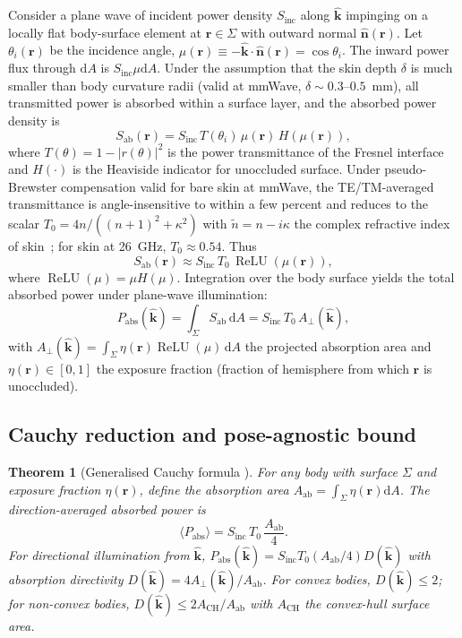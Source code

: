 \documentclass[journal,twocolumn,10pt]{IEEEtran}
\newtheorem{theorem}{Theorem}
\theoremstyle{definition}
\newcommand{\khat}{\hat{\bm{k}}}
\newcommand{\nhat}{\hat{\bm{n}}}
\newcommand{\rr}{\mathbf{r}}
\newcommand{\Sab}{S_{\mathrm{ab}}}
\newcommand{\Sinc}{S_{\mathrm{inc}}}
\newcommand{\Pabs}{P_{\mathrm{abs}}}
\newcommand{\diff}{\mathrm{d}}
\newcommand{\Aperp}{A_{\perp}}
\newcommand{\Aab}{A_{\mathrm{ab}}}
\DeclareMathOperator{\ReLU}{ReLU}
\begin{document}
Consider a plane wave of incident power density $\Sinc$ along
$\khat$ impinging on a locally flat body-surface element at
$\rr\in\Sigma$ with outward normal $\nhat(\rr)$. Let
$\theta_i(\rr)$ be the incidence angle,
$\mu(\rr)\equiv-\khat\cdot\nhat(\rr)=\cos\theta_i$. The inward
power flux through $\diff A$ is $\Sinc\mu\diff A$. Under the
assumption that the skin depth $\delta$ is much smaller than
body curvature radii (valid at mmWave,
$\delta\sim 0.3$--$0.5$~mm), all transmitted power is absorbed
within a surface layer, and the absorbed power density is
\begin{equation}\label{eq:Sab-pt}
  \Sab(\rr)=\Sinc\,T(\theta_i)\,\mu(\rr)\,H(\mu(\rr)),
\end{equation}
where $T(\theta)=1-|r(\theta)|^2$ is the power transmittance of
the Fresnel interface and $H(\cdot)$ is the Heaviside indicator
for unoccluded surface. Under pseudo-Brewster compensation valid
for bare skin at mmWave, the TE/TM-averaged transmittance is
angle-insensitive to within a few percent and reduces to the
scalar $T_0=4n/((n+1)^2+\kappa^2)$ with $\tilde{n}=n-i\kappa$ the
complex refractive index of skin~\cite{WydaegheMonograph,Gabriel1996};
for skin at 26~GHz, $T_0\approx 0.54$. Thus
\begin{equation}\label{eq:Sab-T0}
  \Sab(\rr)\approx \Sinc\,T_0\,\ReLU(\mu(\rr)),
\end{equation}
where $\ReLU(\mu)=\mu H(\mu)$. Integration over the body
surface yields the total absorbed power under plane-wave
illumination:
\begin{equation}\label{eq:Pabs-plane}
  \Pabs(\khat)=\int_\Sigma \Sab\,\diff A
  =\Sinc\,T_0\,\Aperp(\khat),
\end{equation}
with $\Aperp(\khat)=\int_\Sigma\eta(\rr)\ReLU(\mu)\,\diff A$ the
projected absorption area and $\eta(\rr)\in[0,1]$ the exposure
fraction (fraction of hemisphere from which $\rr$ is unoccluded).

\subsection{Cauchy reduction and pose-agnostic bound}\label{sec:cauchy}

\begin{theorem}[Generalised Cauchy formula
\cite{Cauchy1841,WydaegheMonograph}]\label{thm:gen-cauchy}
For any body with surface $\Sigma$ and exposure fraction
$\eta(\rr)$, define the absorption area
$\Aab=\int_\Sigma\eta(\rr)\diff A$. The direction-averaged
absorbed power is
\begin{equation}
  \langle\Pabs\rangle=\Sinc\,T_0\,\frac{\Aab}{4}.
\end{equation}
For directional illumination from $\khat$,
$\Pabs(\khat)=\Sinc T_0(\Aab/4)D(\khat)$ with
\emph{absorption directivity}
$D(\khat)=4\Aperp(\khat)/\Aab$. For convex bodies,
$D(\khat)\le 2$; for non-convex bodies,
$D(\khat)\le 2A_{\mathrm{CH}}/\Aab$ with $A_{\mathrm{CH}}$ the
convex-hull surface area.
\end{theorem}
\end{document}
